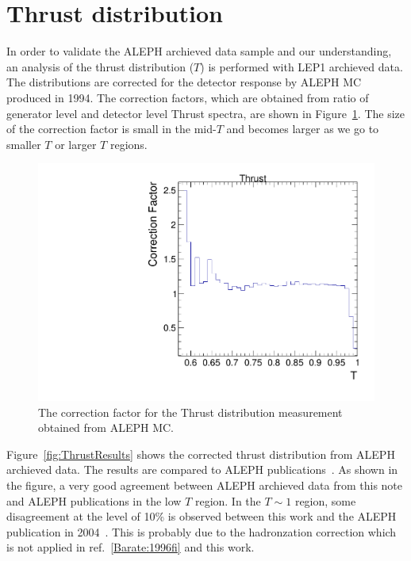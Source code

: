 \section{Thrust distribution}

In order to validate the ALEPH archieved data sample and our understanding,
an analysis of the thrust distribution ($T$) is performed with LEP1 archieved
data. The distributions are corrected for the detector response by ALEPH MC
produced in 1994. The correction factors, which are obtained from ratio of generator level and detector level Thrust spectra, are shown in Figure~\ref{fig:ThrustCorr}. The size of the correction factor is small in the mid-$T$
and becomes larger as we go to smaller $T$ or larger $T$ regions.

\begin{figure}[H]
\centering
\includegraphics[width=.5\textwidth]{images/Thrust/correction.pdf}
\caption{The correction factor for the Thrust distribution measurement obtained from ALEPH MC.}
\label{fig:ThrustCorr}
\end{figure}

Figure~\ref{fig:ThrustResults} shows the corrected thrust distribution from ALEPH archieved data. The results are compared to ALEPH
publications~\cite{Barate:1996fi,heister:2003aj}. As shown in the figure, a very good agreement between ALEPH archieved data from this note
and ALEPH publications in the low $T$ region. In the $T\sim 1$ region, some disagreement at the level of 10\% is observed between this work
and the ALEPH publication in 2004~\cite{heister:2003aj}. This is probably due to the hadronzation correction which is not applied in
ref.~\ref{Barate:1996fi} and this work. 


